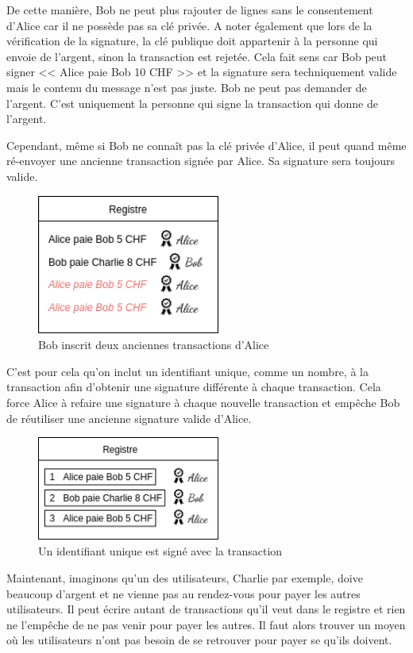 De cette manière, Bob ne peut plus rajouter de lignes sans le consentement d'Alice car il ne possède pas sa clé privée. A noter également que lors de la vérification de la signature, la clé publique doit appartenir à la personne qui envoie de l'argent, sinon la transaction est rejetée. Cela fait sens car Bob peut signer << Alice paie Bob 10 CHF >> et la signature sera techniquement valide mais le contenu du message n'est pas juste. Bob ne peut pas demander de l'argent. C'est uniquement la personne qui signe la transaction qui donne de l'argent. 

Cependant, même si Bob ne connaît pas la clé privée d'Alice, il peut quand même ré-envoyer une ancienne transaction signée par Alice. Sa signature sera toujours valide.

\begin{figure}[H]
  \centering
  \includegraphics[width=6cm]{images/crypto_4.png}
  \caption{Bob inscrit deux anciennes transactions d'Alice}
\end{figure}

C'est pour cela qu'on inclut un identifiant unique, comme un nombre, à la transaction afin d'obtenir une signature différente à chaque transaction. Cela force Alice à refaire une signature à chaque nouvelle transaction et empêche Bob de réutiliser une ancienne signature valide d'Alice.

\begin{figure}[H]
  \centering
  \includegraphics[width=6cm]{images/crypto_5.png}
  \caption{Un identifiant unique est signé avec la transaction}
\end{figure}

Maintenant, imaginons qu'un des utilisateurs, Charlie par exemple, doive beaucoup d'argent et ne vienne pas au rendez-vous pour payer les autres utilisateurs. Il peut écrire autant de transactions qu'il veut dans le registre et rien ne l'empêche de ne pas venir pour payer les autres. Il faut alors trouver un moyen où les utilisateurs n'ont pas besoin de se retrouver pour payer se qu'ils doivent.

